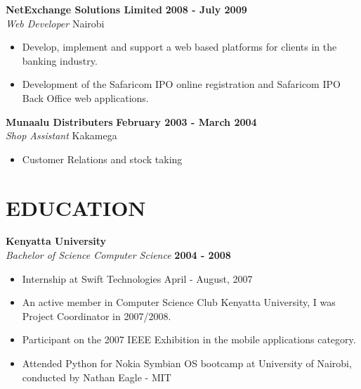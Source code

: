 \documentclass{res}
\begin{document}
\begin{resume}
\vspace{8pt}
\textbf{NetExchange Solutions Limited} \hfill        \textbf{2008 - July 2009} \\
\emph{Web Developer}       \hfill   Nairobi

\begin{itemize} \itemsep -2pt %
        \item Develop, implement and support a web based platforms for clients in the banking industry.
        \item Development of the Safaricom IPO online registration and Safaricom IPO Back Office web applications.
 \end{itemize} \vspace{-4pt}
 
\vspace{8pt}
\textbf{Munaalu Distributers} \hfill        \textbf{February 2003 - March 2004} \\
\emph{Shop Assistant}       \hfill   Kakamega

\begin{itemize} \itemsep -2pt %
        \item Customer Relations and stock taking
\end{itemize} \vspace{-4pt}


\section{EDUCATION}
\vspace{8pt}
\textbf{Kenyatta University}  \\
\emph{Bachelor of Science Computer Science} \hfill \textbf{2004 - 2008}
   \begin{itemize} \itemsep -2pt %
        \item Internship at Swift Technologies \hfill   April - August, 2007
        \item An active member  in Computer  Science Club Kenyatta University, I was Project Coordinator in 2007/2008.
        \item Participant on the 2007 IEEE Exhibition in the mobile applications category.
        \item Attended Python for Nokia Symbian OS bootcamp at University of Nairobi, conducted by Nathan Eagle - MIT
    \end{itemize} \vspace{-6pt}


\end{resume}
\end{document}
